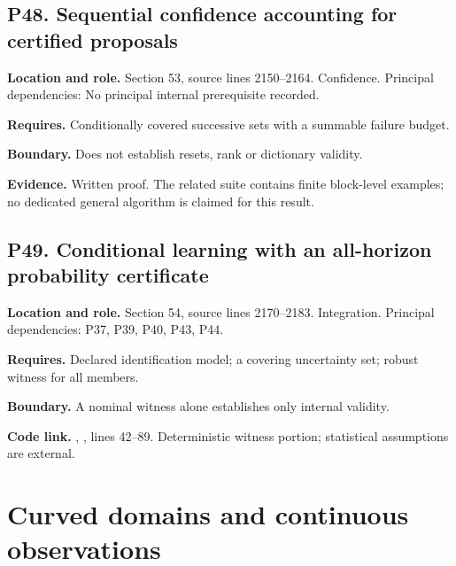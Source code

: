 \documentclass[11pt,letterpaper]{article}
\begin{document}
\par\noindent\begin{minipage}{\textwidth}
\subsection{P48. Sequential confidence accounting for certified
proposals}\label{p48.-sequential-confidence-accounting-for-certified-proposals}

\textbf{Location and role.} Section 53, source lines 2150--2164.
Confidence. Principal dependencies: No principal internal prerequisite
recorded.

\textbf{Requires.} Conditionally covered successive sets with a summable
failure budget.

\textbf{Boundary.} Does not establish resets, rank or dictionary
validity.

\textbf{Evidence.} Written proof. The related suite contains finite
block-level examples; no dedicated general algorithm is claimed for this
result.
\end{minipage}\par\medskip

\par\noindent\begin{minipage}{\textwidth}
\subsection{P49. Conditional learning with an all-horizon probability
certificate}\label{p49.-conditional-learning-with-an-all-horizon-probability-certificate}

\textbf{Location and role.} Section 54, source lines 2170--2183.
Integration. Principal dependencies: P37, P39, P40, P43, P44.

\textbf{Requires.} Declared identification model; a covering uncertainty
set; robust witness for all members.

\textbf{Boundary.} A nominal witness alone establishes only internal
validity.

\textbf{Code link.} ,
, lines 42--89. Deterministic witness
portion; statistical assumptions are external.
\end{minipage}\par\medskip

\newpage

\section{Curved domains and continuous
observations}\label{curved-domains-and-continuous-observations}
\end{document}
